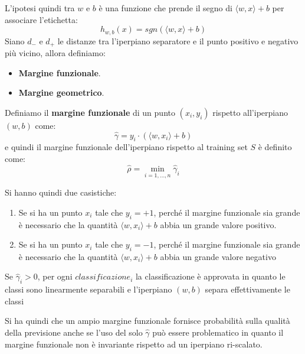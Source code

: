 L'ipotesi quindi tra $w$ e $b$ è una funzione che prende il segno di
$\langle w, x \rangle + b$ per associare l'etichetta:
\begin{equation}
    h_{w,b} (x) = sgn(\langle w, x \rangle + b)
\end{equation}
Siano $d_{-}$ e $d_{+}$ le distanze tra l'iperpiano separatore e il punto positivo
e negativo più vicino, allora definiamo:
\begin{itemize}
    \item \textbf{Margine funzionale}.
    \item \textbf{Margine geometrico}.
\end{itemize}
\begin{definizione}
    Definiamo il \textbf{margine funzionale} di un punto $(x_i, y_i)$ rispetto
    all'iperpiano $(w, b)$ come:
    \begin{equation}
        \hat{\gamma} = y_i \cdot ( \langle w, x_i \rangle + b )
    \end{equation}
    e quindi il margine funzionale dell'iperpiano rispetto al training set $S$ è definito come:
    \begin{equation}
        \hat{\rho} = \min_{i = 1, \dots, n} \hat{\gamma}_i
    \end{equation}
\end{definizione}
Si hanno quindi due casistiche:
\begin{enumerate}
    \item Se si ha un punto $x_i$ tale che $y_i = +1$, perché il margine
          funzionale sia grande è necessario che la quantità $\langle w, x_i \rangle + b$
          abbia un grande valore positivo.
    \item Se si ha un punto $x_i$ tale che $y_i = -1$, perché il margine funzionale
          sia grande è necessario che la quantità $\langle w, x_i \rangle + b$ abbia
          un grande valore negativo
\end{enumerate}
\begin{teorema}
    Se $\hat{\gamma}_i > 0$, per ogni $classificazione_i$ la classificazione è
    approvata in quanto le classi sono linearmente separabili e l'iperpiano
    $(w, b)$ separa effettivamente le classi
\end{teorema}
Si ha quindi che un ampio margine funzionale fornisce probabilità sulla qualità
della previsione anche se l'uso del solo $\hat{\gamma}$ può essere problematico
in quanto il margine funzionale non è invariante rispetto ad un iperpiano ri-scalato.

